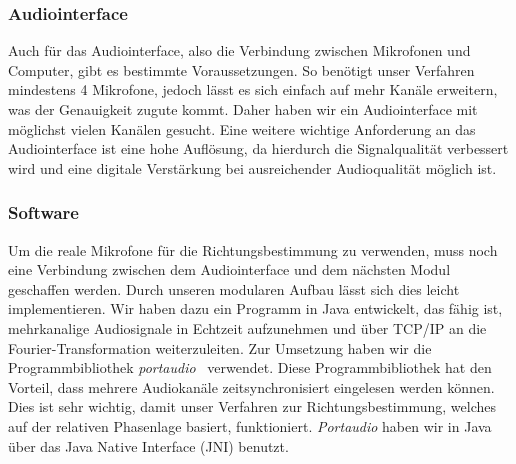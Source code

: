 \subsubsection{Audiointerface}
Auch für das Audiointerface, also die Verbindung zwischen Mikrofonen und Computer, gibt es bestimmte Voraussetzungen. So benötigt unser Verfahren mindestens \num{4} Mikrofone, jedoch lässt es sich einfach auf mehr Kanäle erweitern, was der Genauigkeit zugute kommt. Daher haben wir ein Audiointerface mit möglichst vielen Kanälen gesucht. Eine weitere wichtige Anforderung an das Audiointerface ist eine hohe Auflösung, da hierdurch die Signalqualität verbessert wird und eine digitale Verstärkung bei ausreichender Audioqualität möglich ist.
\subsubsection{Software}
Um die reale Mikrofone für die Richtungsbestimmung zu verwenden, muss noch eine Verbindung zwischen dem Audiointerface und dem nächsten Modul geschaffen werden. Durch unseren modularen Aufbau lässt sich dies leicht implementieren. Wir haben dazu ein Programm in Java entwickelt, das fähig ist, mehrkanalige Audiosignale in Echtzeit aufzunehmen und über TCP/IP an die Fourier-Transformation weiterzuleiten. Zur Umsetzung haben wir die Programmbibliothek \textit{portaudio}~\cite{portaudio} verwendet. Diese Programmbibliothek hat den Vorteil, dass mehrere Audiokanäle zeitsynchronisiert eingelesen werden können. Dies ist sehr wichtig, damit unser Verfahren zur Richtungsbestimmung, welches auf der relativen Phasenlage basiert, funktioniert. \textit{Portaudio} haben wir in Java über das Java Native Interface (JNI) benutzt.

